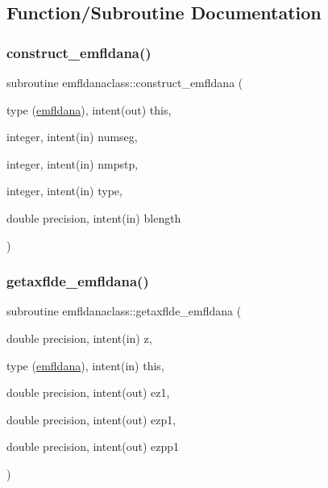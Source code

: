 \subsection{Function/\+Subroutine Documentation}
\mbox{\label{namespaceemfldanaclass_a56809546255dc4d8ef545de43f8ced80}} 
\subsubsection{\texorpdfstring{construct\_emfldana()}{construct\_emfldana()}}
{\footnotesize\ttfamily subroutine emfldanaclass\+::construct\+\_\+emfldana (\begin{DoxyParamCaption}\item[{type (\mbox{\hyperlink{namespaceemfldanaclass_structemfldanaclass_1_1emfldana}{emfldana}}), intent(out)}]{this,  }\item[{integer, intent(in)}]{numseg,  }\item[{integer, intent(in)}]{nmpstp,  }\item[{integer, intent(in)}]{type,  }\item[{double precision, intent(in)}]{blength }\end{DoxyParamCaption})}

\mbox{\label{namespaceemfldanaclass_a4f3936b925964dccc4f9911bcf93c2d7}} 
\subsubsection{\texorpdfstring{getaxflde\_emfldana()}{getaxflde\_emfldana()}}
{\footnotesize\ttfamily subroutine emfldanaclass\+::getaxflde\+\_\+emfldana (\begin{DoxyParamCaption}\item[{double precision, intent(in)}]{z,  }\item[{type (\mbox{\hyperlink{namespaceemfldanaclass_structemfldanaclass_1_1emfldana}{emfldana}}), intent(in)}]{this,  }\item[{double precision, intent(out)}]{ez1,  }\item[{double precision, intent(out)}]{ezp1,  }\item[{double precision, intent(out)}]{ezpp1 }\end{DoxyParamCaption})}



